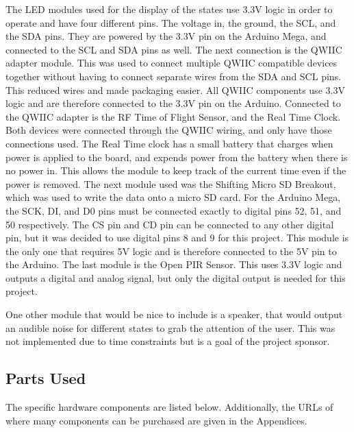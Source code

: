 \documentclass{article}
\begin{document}
The LED modules used for the display of the states use 3.3V logic in order to operate and have four different pins. The voltage in, the ground, the SCL, and the SDA pins. They are powered by the 3.3V pin on the Arduino Mega, and connected to the SCL and SDA pins as well. The next connection is the QWIIC adapter module. This was used to connect multiple QWIIC compatible devices together without having to connect separate wires from the SDA and SCL pins. This reduced wires and made packaging easier. All QWIIC components use 3.3V logic and are therefore connected to the 3.3V pin on the Arduino. Connected to the QWIIC adapter is the RF Time of Flight Sensor, and the Real Time Clock. Both devices were connected through the QWIIC wiring, and only have those connections used. The Real Time clock has a small battery that charges when power is applied to the board, and expends power from the battery when there is no power in. This allows the module to keep track of the current time even if the power is removed. The next module used was the Shifting Micro SD Breakout, which was used to write the data onto a micro SD card. For the Arduino Mega, the SCK, DI, and D0 pins must be connected exactly to digital pins 52, 51, and 50 respectively. The CS pin and CD pin can be connected to any other digital pin, but it was decided to use digital pins 8 and 9 for this project. This module is the only one that requires 5V logic and is therefore connected to the 5V pin to the Arduino. The last module is the Open PIR Sensor. This uses 3.3V logic and outputs a digital and analog signal, but only the digital output is needed for this project. 

One other module that would be nice to include is a speaker, that would output an audible noise for different states to grab the attention of the user. This was not implemented due to time constraints but is a goal of the project sponsor.

\subsection{Parts Used}
The specific hardware components are listed below. Additionally, the URLs of where many components can be purchased are given in the Appendices. 
\end{document}
